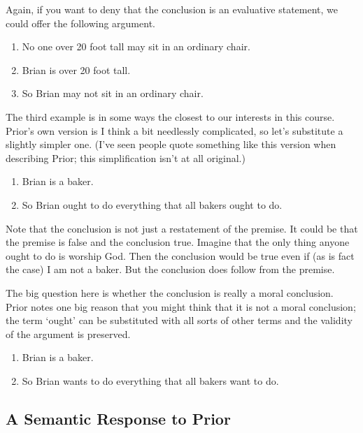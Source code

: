 \documentclass[
]{article}
\providecommand{\tightlist}{%
  \setlength{\itemsep}{0pt}\setlength{\parskip}{0pt}}
\begin{document}
Again, if you want to deny that the conclusion is an evaluative
statement, we could offer the following argument.

\begin{enumerate}
\def\labelenumi{\arabic{enumi}.}
\tightlist
\item
  No one over 20 foot tall may sit in an ordinary chair.
\item
  Brian is over 20 foot tall.
\item
  So Brian may not sit in an ordinary chair.
\end{enumerate}

The third example is in some ways the closest to our interests in this
course. Prior's own version is I think a bit needlessly complicated, so
let's substitute a slightly simpler one. (I've seen people quote
something like this version when describing Prior; this simplification
isn't at all original.)

\begin{enumerate}
\def\labelenumi{\arabic{enumi}.}
\tightlist
\item
  Brian is a baker.
\item
  So Brian ought to do everything that all bakers ought to do.
\end{enumerate}

Note that the conclusion is not just a restatement of the premise. It
could be that the premise is false and the conclusion true. Imagine that
the only thing anyone ought to do is worship God. Then the conclusion
would be true even if (as is fact the case) I am not a baker. But the
conclusion does follow from the premise.

The big question here is whether the conclusion is really a moral
conclusion. Prior notes one big reason that you might think that it is
not a moral conclusion; the term `ought' can be substituted with all
sorts of other terms and the validity of the argument is preserved.

\begin{enumerate}
\def\labelenumi{\arabic{enumi}.}
\tightlist
\item
  Brian is a baker.
\item
  So Brian wants to do everything that all bakers want to do.
\end{enumerate}

\hypertarget{a-semantic-response-to-prior}{%
\subsection{A Semantic Response to
Prior}\label{a-semantic-response-to-prior}}
\end{document}
